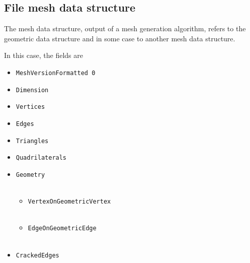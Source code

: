 \documentclass[a4paper,twoside,12pt]{book}
\begin{document}
\subsection{File mesh data structure}
 \label{meshformatfile.mesh}
The mesh data structure, output of a mesh generation algorithm,
refers to the geometric data structure and in some case to another
mesh data structure.

In this case, the fields are

\small
\begin{itemize}
\item {\tt MeshVersionFormatted 0}
\end{itemize}
\normalsize

\small
\begin{itemize}
\item {\tt Dimension}

\item {\tt Vertices}
  \\

\item {\tt Edges}
   \\

\item {\tt Triangles}
   \\

\item {\tt Quadrilaterals}
   \\




\item {\tt Geometry} \\
 \\

\begin{itemize}
\item {\tt VertexOnGeometricVertex} \\
   \\

\item {\tt EdgeOnGeometricEdge} \\
   \\
\end{itemize}

\item {\tt CrackedEdges}
  \\

\end{itemize}
\normalsize
\end{document}
